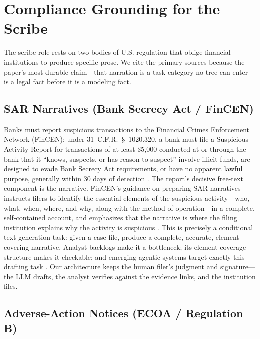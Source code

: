 \section{Compliance Grounding for the Scribe}
\label{sec:p8-compliance}

The scribe role rests on two bodies of U.S. regulation that oblige financial
institutions to produce specific prose. We cite the primary sources because
the paper's most durable claim---that narration is a task category no tree can
enter---is a legal fact before it is a modeling fact.

\subsection{SAR Narratives (Bank Secrecy Act / FinCEN)}
\label{sec:p8-sar}

Banks must report suspicious transactions to the Financial Crimes Enforcement
Network (FinCEN): under 31~C.F.R.~\S~1020.320, a bank must file a Suspicious
Activity Report for transactions of at least \$5{,}000 conducted at or through
the bank that it ``knows, suspects, or has reason to suspect'' involve illicit
funds, are designed to evade Bank Secrecy Act requirements, or have no
apparent lawful purpose, generally within 30 days of detection
\citep{cfr1020_320}. The report's decisive free-text component is the
narrative. FinCEN's guidance on preparing SAR narratives instructs filers to
identify the essential elements of the suspicious activity---who, what, when,
where, and why, along with the method of operation---in a complete,
self-contained account, and emphasizes that the narrative is where the filing
institution explains why the activity is suspicious
\citep{fincen2003sarnarrative}. This is precisely a conditional
text-generation task: given a case file, produce a complete, accurate,
element-covering narrative. Analyst backlogs make it a bottleneck; its
element-coverage structure makes it checkable; and emerging agentic systems
target exactly this drafting task \citep{naik2025coinvestigator}. Our
architecture keeps the human filer's judgment and signature---the LLM drafts,
the analyst verifies against the evidence links, and the institution files.

\subsection{Adverse-Action Notices (ECOA / Regulation B)}
\label{sec:p8-adverse}

